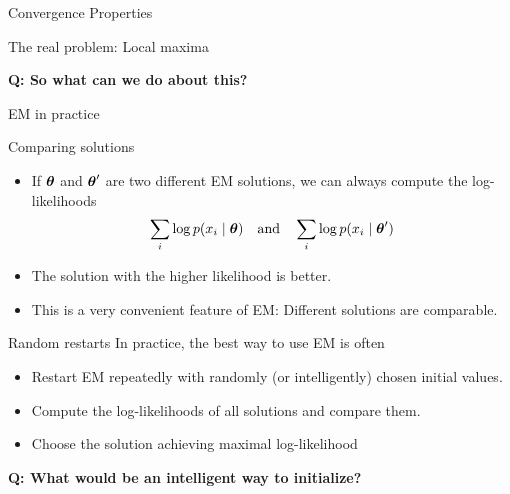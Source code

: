 \documentclass[10pt]{beamer}
\begin{document}
\begin{frame}{Convergence Properties}
\begin{sblock}{The real problem: Local maxima}
\end{sblock}
\vfill \tiny \bf{Q:} So what can we do about this?
\end{frame}

\begin{frame}{EM in practice}
\footnotesize
\begin{sblock}{Comparing solutions}
\begin{itemize}
\item If ${\boldsymbol \theta}$ and ${\boldsymbol \theta}^\prime$ are two different EM solutions, we can always compute the log-likelihoods
\[ \displaystyle\sum_i \log p(x_i \; | \; {\boldsymbol \theta}) \quad \text{and} \quad \displaystyle\sum_i \log p(x_i \; | \; {\boldsymbol \theta}^\prime) \]
\item The solution with the higher likelihood is better.
\item This is a very convenient feature of EM: Different solutions are comparable. 
\end{itemize}
\end{sblock}
\pause
\begin{sblock}{Random restarts}
In practice, the best way to use EM is often
\begin{itemize}
\item Restart EM repeatedly with randomly (or intelligently) chosen initial values.
\item Compute the log-likelihoods of all solutions and compare them.
\item Choose the solution achieving maximal log-likelihood
\end{itemize}
\end{sblock}
\vfill
\tiny \bf{Q}: What would be an intelligent way to initialize?
\end{frame}
\end{document}
